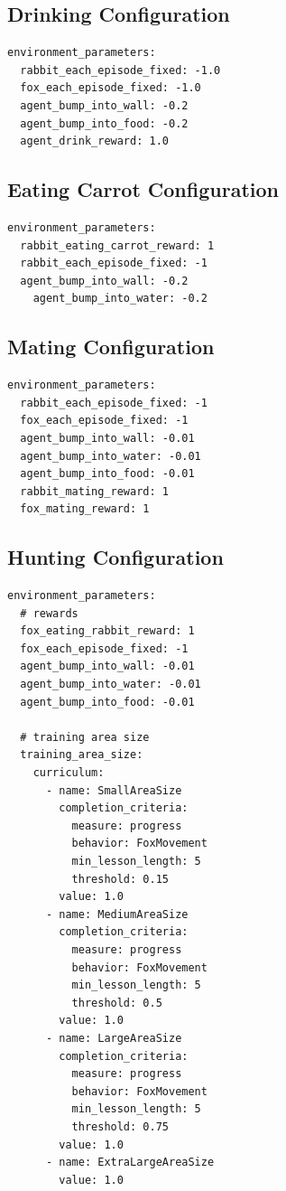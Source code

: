 \subsection{Drinking Configuration}
\begin{lstlisting}
environment_parameters:
  rabbit_each_episode_fixed: -1.0
  fox_each_episode_fixed: -1.0
  agent_bump_into_wall: -0.2
  agent_bump_into_food: -0.2
  agent_drink_reward: 1.0
\end{lstlisting}

\subsection{Eating Carrot Configuration}
\begin{lstlisting}
environment_parameters:
  rabbit_eating_carrot_reward: 1
  rabbit_each_episode_fixed: -1
  agent_bump_into_wall: -0.2
    agent_bump_into_water: -0.2
\end{lstlisting}

\subsection{Mating Configuration}
\begin{lstlisting}
environment_parameters:
  rabbit_each_episode_fixed: -1
  fox_each_episode_fixed: -1
  agent_bump_into_wall: -0.01
  agent_bump_into_water: -0.01
  agent_bump_into_food: -0.01
  rabbit_mating_reward: 1
  fox_mating_reward: 1
\end{lstlisting}

\subsection{Hunting Configuration}
\begin{lstlisting}
environment_parameters:
  # rewards
  fox_eating_rabbit_reward: 1
  fox_each_episode_fixed: -1
  agent_bump_into_wall: -0.01
  agent_bump_into_water: -0.01
  agent_bump_into_food: -0.01

  # training area size
  training_area_size:
    curriculum:
      - name: SmallAreaSize
        completion_criteria:
          measure: progress
          behavior: FoxMovement
          min_lesson_length: 5
          threshold: 0.15
        value: 1.0
      - name: MediumAreaSize
        completion_criteria:
          measure: progress
          behavior: FoxMovement
          min_lesson_length: 5
          threshold: 0.5
        value: 1.0
      - name: LargeAreaSize
        completion_criteria:
          measure: progress
          behavior: FoxMovement
          min_lesson_length: 5
          threshold: 0.75
        value: 1.0
      - name: ExtraLargeAreaSize
        value: 1.0
\end{lstlisting}

